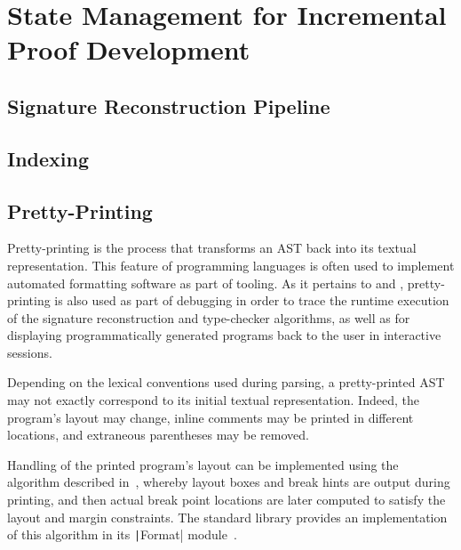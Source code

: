 \chapter{State Management for Incremental Proof Development}


\section{Signature Reconstruction Pipeline}


\section{Indexing}


\section{Pretty-Printing}


Pretty-printing is the process that transforms an \ac{AST} back into its textual representation.
This feature of programming languages is often used to implement automated formatting software as part of tooling.
As it pertains to \Beluga and \Harpoon, pretty-printing is also used as part of debugging in order to trace the runtime execution of the signature reconstruction and type-checker algorithms, as well as for displaying programmatically generated programs back to the user in interactive sessions.


Depending on the lexical conventions used during parsing, a pretty-printed \ac{AST} may not exactly correspond to its initial textual representation.
Indeed, the program's layout may change, inline comments may be printed in different locations, and extraneous parentheses may be removed.

Handling of the printed program's layout can be implemented using the algorithm described in~\cite{oppen1980prettyprinting}, whereby layout boxes and break hints are output during printing, and then actual break point locations are later computed to satisfy the layout and margin constraints.
The \OCaml standard library provides an implementation of this algorithm in its \texttt|Format| module~\cite{leroy2022ocaml}.

